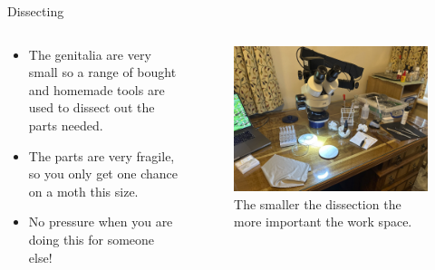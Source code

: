 \documentclass[
  ignorenonframetext,
]{beamer}
\providecommand{\tightlist}{%
  \setlength{\itemsep}{0pt}\setlength{\parskip}{0pt}}
\begin{document}
\begin{frame}{Dissecting}
\protect\hypertarget{dissecting}{}
\begin{columns}[T]
\begin{column}{0.5\textwidth}
\begin{itemize}
\tightlist
\item
  The genitalia are very small so a range of bought and homemade tools
  are used to dissect out the parts needed.
\item
  The parts are very fragile, so you only get one chance on a moth this
  size.
\item
  No pressure when you are doing this for someone else!
\end{itemize}
\end{column}

\begin{column}{0.5\textwidth}
\begin{figure}
\centering
\includegraphics{./images/dissecting.jpg}
\caption{The smaller the dissection the more important the work space.}
\end{figure}
\end{column}
\end{columns}
\end{frame}
\end{document}
